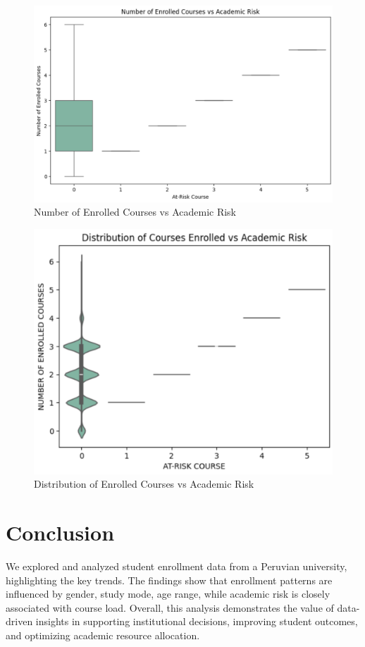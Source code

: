 \documentclass[12pt]{article}
\begin{document}
\begin{figure}[H]
    \centering
    \includegraphics[width=1\linewidth]{boxplot_academic_risk.png}
    \caption{Number of Enrolled Courses vs Academic Risk}
\end{figure}

\begin{figure}[H]
    \centering
    \includegraphics[width=0.8\linewidth]{violinplot_academic_risk.png}
    \caption{Distribution of Enrolled Courses vs Academic Risk}
\end{figure}

\section{Conclusion}
We explored and analyzed student enrollment data from a Peruvian university, highlighting the key trends. The findings show that enrollment patterns are influenced by gender, study mode, age range, while academic risk is closely associated with course load. Overall, this analysis demonstrates the value of data-driven insights in supporting institutional decisions, improving student outcomes, and optimizing academic resource allocation.
\end{document}
